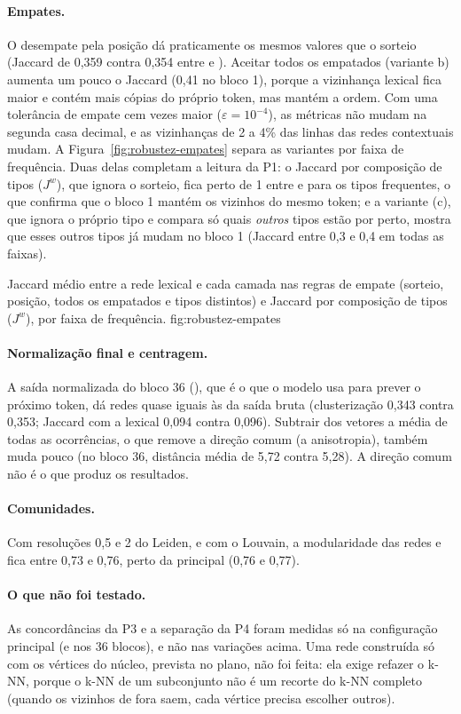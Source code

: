 \paragraph{Empates.} O desempate pela posição dá praticamente os mesmos valores que o sorteio
(Jaccard de 0,359 contra 0,354 entre  e ). Aceitar todos os empatados
(variante b) aumenta um pouco o Jaccard (0,41 no bloco 1), porque a vizinhança lexical fica
maior e contém mais cópias do próprio token, mas mantém a ordem. Com uma tolerância de empate
cem vezes maior ($\varepsilon=10^{-4}$), as métricas não mudam na segunda casa decimal, e as
vizinhanças de 2 a 4\% das linhas das redes contextuais mudam. A
Figura~\ref{fig:robustez-empates} separa as variantes por faixa de frequência. Duas delas
completam a leitura da P1: o Jaccard por composição de tipos ($J^w$), que ignora o sorteio,
fica perto de 1 entre  e  para os tipos frequentes, o que confirma que o
bloco 1 mantém os vizinhos do mesmo token; e a variante (c), que ignora o próprio tipo e compara
só quais \emph{outros} tipos estão por perto, mostra que esses outros tipos já mudam no bloco 1
(Jaccard entre 0,3 e 0,4 em todas as faixas).

    {Jaccard médio entre a rede lexical e cada camada nas regras de empate (sorteio, posição,
    todos os empatados e tipos distintos) e Jaccard por composição de tipos ($J^w$), por faixa
    de frequência.}
    {fig:robustez-empates}

\paragraph{Normalização final e centragem.} A saída normalizada do bloco 36 (),
que é o que o modelo usa para prever o próximo token, dá redes quase iguais às da saída bruta
(clusterização 0,343 contra 0,353; Jaccard com a lexical 0,094 contra 0,096). Subtrair dos
vetores a média de todas as ocorrências, o que remove a direção comum (a anisotropia), também
muda pouco (no bloco 36, distância média de 5,72 contra 5,28). A direção comum não é o que
produz os resultados.

\paragraph{Comunidades.} Com resoluções 0,5 e 2 do Leiden, e com o Louvain, a modularidade das
redes  e  fica entre 0,73 e 0,76, perto da principal (0,76 e 0,77).

\paragraph{O que não foi testado.} As concordâncias da P3 e a separação da P4 foram medidas só
na configuração principal (e nos 36 blocos), e não nas variações acima. Uma rede construída só
com os vértices do núcleo, prevista no plano, não foi feita: ela exige refazer o k-NN, porque o
k-NN de um subconjunto não é um recorte do k-NN completo (quando os vizinhos de fora saem, cada
vértice precisa escolher outros).
